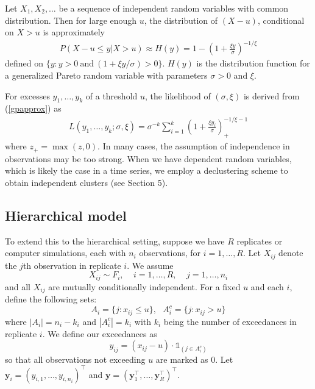 \documentclass[12pt]{article}
\newcommand{\m}[1]{\mathbf{\bm{#1}}}
\newcommand{\ind}{\mathds{1}}
\newcommand{\m}[1]{\mathbf{\bm{#1}}}
\begin{document}
Let $X_1,X_2,\ldots$ be a sequence of independent random variables with common distribution. Then for large enough $u$, the distribution of $(X-u)$, conditional on $X>u$ is approximately
\begin{align}
P(X-u\leq y|X>u) \approx H(y) = 1 - \left(1+\frac{\xi y}{\sigma}\right)^{-1/\xi} \label{gpapprox}
\end{align}
defined on $\{y:y>0~\mathrm{and}~(1+\xi y/\sigma) >0\}$. $H(y)$ is the distribution function for a generalized Pareto random variable with parameters $\sigma>0$ and $\xi$.
\bigskip

For excesses $y_1,\ldots,y_k$ of a threshold $u$, the likelihood of $(\sigma,\xi)$ is derived from (\ref{gpapprox}) as
\begin{align}
L(y_1,\ldots,y_k;\sigma,\xi)=\sigma^{-k}\sum_{i=1}^k\left(1+\frac{\xi y_i}{\sigma}\right)_+^{-1/\xi-1}
\end{align}
where $z_+=\max(z,0)$. In many cases, the assumption of independence in observations may be too strong. When we have dependent random variables, which is likely the case in a time series, we employ a declustering scheme to obtain independent clusters (see Section 5).
\bigskip


\subsection{Hierarchical model}

To extend this to the hierarchical setting, suppose we have $R$ replicates or computer simulations, each with $n_i$ observations, for $i=1,\ldots,R$. Let $X_{ij}$ denote the $j$th observation in replicate $i$. We assume
\[ X_{ij} \sim F_i,~~~~~i=1,\ldots,R,~~~~~j=1,\ldots,n_i \]
and all $X_{ij}$ are mutually conditionally independent. For a fixed $u$ and each $i$, define the following sets:
\[ A_i = \{j:x_{ij}\leq u\},~~~ A_i^c = \{j: x_{ij}>u\} \]
where $|A_i|=n_i-k_i$ and $|A_i^c|=k_i$ with $k_i$ being the number of exceedances in replicate $i$. We define our exceedances as
\[ y_{ij} = (x_{ij}-u)\cdot \ind_{(j \in A_i^c)} \]
so that all observations not exceeding $u$ are marked as $0$. Let $\m{y}_i=(y_{i,1},\ldots,y_{i,n_i})^\top$ and $\m{y}=(\m{y}_1^\top,\ldots,\m{y}_R^\top)^\top$.
\bigskip
\end{document}
